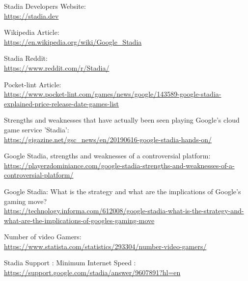 \documentclass[a4paper,12pt]{article}
\newcommand{\link}[1]{{\color{blue}\href{#1}{#1}}}
\begin{document}
\newpage
{}
\begin{thebibliography}{9}

Stadia Developers Website: \\ \link{https://stadia.dev}

Wikipedia Article: \\ \link{https://en.wikipedia.org/wiki/Google\_Stadia}

Stadia Reddit: \\ \link{https://www.reddit.com/r/Stadia/}

Pocket-lint Article: \\ \link{https://www.pocket-lint.com/games/news/google/143589-google-stadia-explained-price-release-date-games-list}

Strengths and weaknesses that have actually been seen playing Google's cloud game service 'Stadia': 
\\ \link{https://gigazine.net/gsc_news/en/20190616-google-stadia-hands-on/}

Google Stadia, strengths and weaknesses of a controversial platform: 
\\ \link{https://playerzdominiance.com/google-stadia-strengths-and-weaknesses-of-a-controversial-platform/}

Google Stadia: What is the strategy and what are the implications of Google's gaming move?
\\ \link{https://technology.informa.com/612008/google-stadia-what-is-the-strategy-and-what-are-the-implications-of-googles-gaming-move}

Number of video Gamers:
\\ \link{https://www.statista.com/statistics/293304/number-video-gamers/}

Stadia Support : Minimum Internet Speed : \\ \link{https://support.google.com/stadia/answer/9607891?hl=en}

\end{thebibliography}
\end{document}

